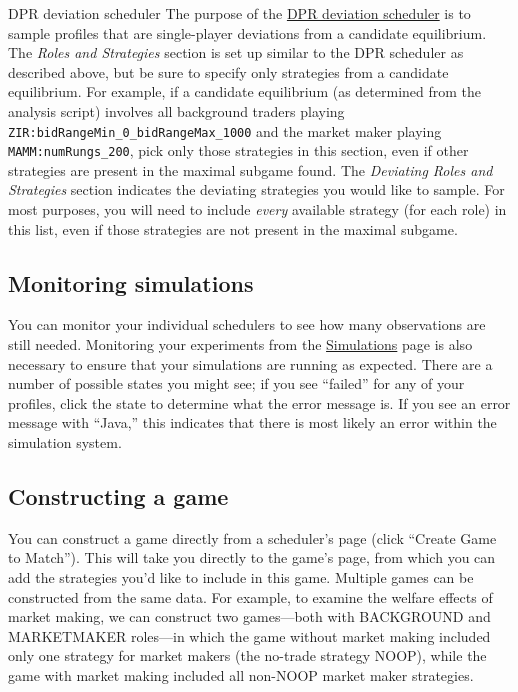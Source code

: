 \documentclass[11pt]{article}
\begin{document}
\begin{paragraph}{DPR deviation scheduler}
The purpose of the \href{http://egtaonline.eecs.umich.edu/dpr_deviation_schedulers/new}{DPR deviation scheduler} is to sample profiles that are single-player deviations from a candidate equilibrium.
The \emph{Roles and Strategies} section is set up similar to the DPR scheduler as described above, but be sure to specify only strategies from a candidate equilibrium. For example, if a candidate equilibrium (as determined from the analysis script) involves all background traders playing \verb|ZIR:bidRangeMin_0_bidRangeMax_1000| and the market maker playing \verb|MAMM:numRungs_200|, pick only those strategies in this section, even if other strategies are present in the maximal subgame found.
The \emph{Deviating Roles and Strategies} section indicates the deviating strategies you would like to sample. For most purposes, you will need to include \emph{every} available strategy (for each role) in this list, even if those strategies are not present in the maximal subgame.
\end{paragraph}


\subsection{Monitoring simulations}
You can monitor your individual schedulers to see how many observations are still needed.
Monitoring your experiments from the \href{http://egtaonline.eecs.umich.edu/simulations}{Simulations} page is also necessary to ensure that your simulations are running as expected.
There are a number of possible states you might see; if you see ``failed'' for any of your profiles, click the state to determine what the error message is. If you see an error message with ``Java,'' this indicates that there is most likely an error within the simulation system.

\subsection{Constructing a game}

You can construct a game directly from a scheduler's page (click ``Create Game to Match''). This will take you directly to the game's page, from which you can add the strategies you'd like to include in this game.
Multiple games can be constructed from the same data.
For example, to examine the welfare effects of market making, we can construct two games---both with BACKGROUND and MARKETMAKER roles---in which the game without market making included only one strategy for market makers (the no-trade strategy NOOP), while the game with market making included all non-NOOP market maker strategies.
\end{document}
